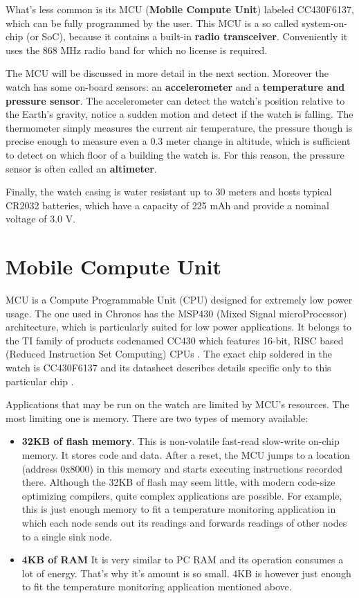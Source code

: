 What's less common is its MCU ({\bf Mobile Compute Unit}) labeled
CC430F6137,  which can be fully programmed by the user. This MCU is a so
called system-on-chip (or SoC), because it contains a built-in {\bf
radio transceiver}. Conveniently it uses the 868 MHz radio band
for which no license is required.

The MCU will be discussed in more detail in the next section.
Moreover the watch has some on-board sensors: an {\bf accelerometer}
and a {\bf temperature and pressure sensor}. The accelerometer can
detect the watch's position relative to the Earth's gravity, notice a
sudden motion and detect if the watch is falling. The thermometer
simply measures the current air temperature, the pressure though is
precise enough to measure even a 0.3 meter change in altitude, which
is sufficient to detect on which floor of a building the watch is. For
this reason, the pressure sensor is often called an {\bf altimeter}.

Finally, the watch casing is water resistant up to 30 meters and hosts
typical CR2032 batteries, which have a capacity of 225 mAh and provide
a nominal voltage of 3.0 V.

\section{Mobile Compute Unit}

MCU is a Compute Programmable Unit (CPU) designed for extremely
low power usage. The one used in Chronos has the MSP430 (Mixed Signal
microProcessor) architecture, which is particularly suited for low
power applications. It belongs to the TI family of products codenamed
CC430 which features 16-bit, RISC based (Reduced Instruction Set
Computing) CPUs \cite{CC430ds}. The exact chip soldered in the watch
is CC430F6137 and its datasheet describes details specific only to this
particular chip \cite{CC430F6137ds}.

Applications that may be run on the watch are limited by MCU's
resources. The most limiting one is memory. There are two types
of memory available:
\begin{itemize}
  \item {\bf 32KB of flash memory}. This is non-volatile fast-read
    slow-write on-chip memory. It stores code and data. After a reset,
    the MCU jumps to a location (address 0x8000) in this memory and
    starts executing instructions recorded there. Although the 32KB of
    flash may seem little, with modern code-size optimizing compilers,
    quite complex applications are possible. For example, this is just
    enough memory to fit a temperature monitoring application in which
    each node sends out its readings and forwards readings of other
    nodes to a single sink node.
  \item {\bf 4KB of RAM} It is very similar to PC RAM and its
    operation consumes a lot of energy. That's why it's amount is so
    small. 4KB is however just enough to fit the temperature monitoring
    application mentioned above.
\end{itemize}

